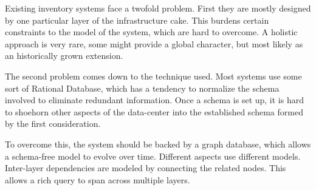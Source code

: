 Existing inventory systems face a twofold problem. First they are mostly designed by one particular layer of the infrastructure cake.
This burdens certain constraints to the model of the system, which are hard to overcome. A holistic approach is very rare, some might
provide a global character, but most likely as an historically grown extension.

The second problem comes down to the technique used. Most systems use some sort of Rational Database, which has a tendency to normalize
the schema involved to eliminate redundant information. Once a schema is set up, it is hard to shoehorn other aspects of the data-center into
the established schema formed by the first consideration.

To overcome this, the system should be backed by a graph database, which allows a schema-free model to evolve over time. Different aspects
use different models. Inter-layer dependencies are modeled by connecting the related nodes. This allows a rich query to span across multiple layers.
